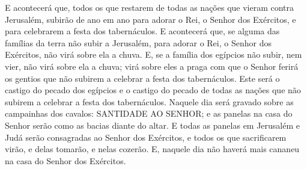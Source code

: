 E acontecerá que, todos os que restarem de todas as nações que
vieram contra Jerusalém, subirão de ano em ano para adorar o Rei, o
Senhor dos Exércitos, e para celebrarem a festa dos tabernáculos.
E acontecerá que, se alguma das famílias da terra não subir a
Jerusalém, para adorar o Rei, o Senhor dos Exércitos, não virá sobre
ela a chuva. E, se a família dos egípcios não subir, nem
vier, não virá sobre ela a chuva; virá sobre eles a praga com que o
Senhor ferirá os gentios que não subirem a celebrar a festa dos
tabernáculos. Este será o castigo do pecado dos egípcios e o
castigo do pecado de todas as nações que não subirem a celebrar a
festa dos tabernáculos. Naquele dia será gravado sobre as
campainhas dos cavalos: SANTIDADE AO SENHOR; e as panelas na casa do
Senhor serão como as bacias diante do altar. E todas as
panelas em Jerusalém e Judá serão consagradas ao Senhor dos
Exércitos, e todos os que sacrificarem virão, e delas tomarão, e
nelas cozerão. E, naquele dia não haverá mais cananeu na casa do
Senhor dos Exércitos.

